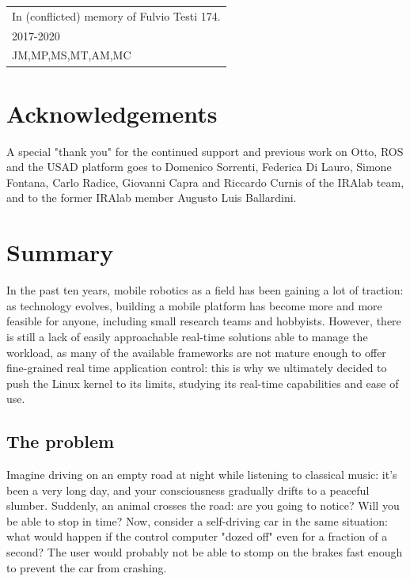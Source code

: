\documentclass[a4paper,12pt]{report}
\begin{document}

\newpage
\begin{flushright}
  \itshape
  \begin{tabular}{@{}l@{}}
    In (conflicted) memory of Fulvio Testi 174.\\
    2017-2020\\ JM,MP,MS,MT,AM,MC 
  \end{tabular}
\end{flushright}
\newpage
\tableofcontents
\newpage
\setlength{\parskip}{1em}
\chapter*{Acknowledgements}
A special "thank you" for the continued support and previous work on Otto, ROS and the USAD platform goes to Domenico Sorrenti, Federica Di Lauro, Simone Fontana, Carlo Radice, Giovanni Capra and Riccardo Curnis of the IRAlab team, and to the former IRAlab member Augusto Luis Ballardini.

\chapter{Summary}

In the past ten years, mobile robotics as a field has been gaining a lot of traction: as technology evolves, building a mobile platform has become more and more feasible for anyone, including small research teams and hobbyists. However, there is still a lack of easily approachable real-time solutions able to manage the workload, as many of the available frameworks are not mature enough to offer fine-grained real time application control: this is why we ultimately decided to push the Linux kernel to its limits, studying its real-time capabilities and ease of use.

\section{The problem}

Imagine driving on an empty road at night while listening to classical music: it's been a very long day, and your consciousness gradually drifts to a peaceful slumber. Suddenly, an animal crosses the road: are you going to notice? Will you be able to stop in time? Now, consider a self-driving car in the same situation: what would happen if the control computer "dozed off" even for a fraction of a second? The user would probably not be able to stomp on the brakes fast enough to prevent the car from crashing.
\end{document}
